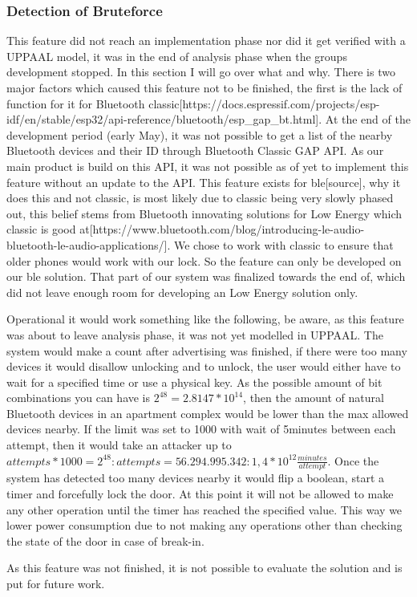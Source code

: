 \subsubsection{Detection of Bruteforce}
This feature did not reach an implementation phase nor did it get verified with a UPPAAL model, it was in the end of analysis phase when the groups development stopped. In this section I will go over what and why. There is two major factors which caused this feature not to be finished, the first is the lack of function for it for Bluetooth classic[https://docs.espressif.com/projects/esp-idf/en/stable/esp32/api-reference/bluetooth/esp\_gap\_bt.html]. At the end of the development period (early May), it was not possible to get a list of the nearby Bluetooth devices and their ID through Bluetooth Classic GAP API. As our main product is build on this API, it was not possible as of yet to implement this feature without an update to the API. This feature exists for \gls{ble}[source], why it does this and not classic, is most likely due to classic being very slowly phased out, this belief stems from Bluetooth innovating solutions for Low Energy which classic is good at[https://www.bluetooth.com/blog/introducing-le-audio-bluetooth-le-audio-applications/]. We chose to work with classic to ensure that older phones would work with our lock. So the feature can only be developed on our \gls{ble} solution. That part of our system was finalized towards the end of, which did not leave enough room for developing an Low Energy solution only.

Operational it would work something like the following, be aware, as this feature was about to leave analysis phase, it was not yet modelled in UPPAAL. The system would make a count after advertising was finished, if there were too many devices it would disallow unlocking and to unlock, the user would either have to wait for a specified time or use a physical key. As the possible amount of bit combinations you can have is $2^{48}=2.8147*10^{14}$, then the amount of natural Bluetooth devices in an apartment complex would be lower than the max allowed devices nearby. If the limit was set to 1000 with wait of 5minutes between each attempt, then it would take an attacker up to $attempts*1000=2^{48} : attempts=56.294.995.342 :  1,4*10^{12} \frac{minutes}{attempt}$. Once the system has detected too many devices nearby it would flip a boolean, start a timer and forcefully lock the door. At this point it will not be allowed to make any other operation until the timer has reached the specified value. This way we lower power consumption due to not making any operations other than checking the state of the door in case of break-in.

As this feature was not finished, it is not possible to evaluate the solution and is put for future work.